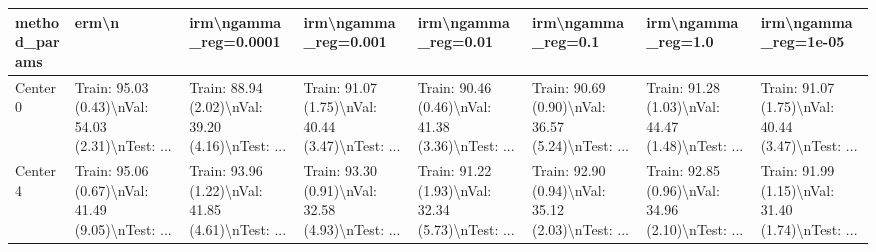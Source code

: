 \begin{tabular}{llllllll}
\toprule
method\_params &                                              erm\textbackslash n &                              irm\textbackslash ngamma\_reg=0.0001 &                               irm\textbackslash ngamma\_reg=0.001 &                                irm\textbackslash ngamma\_reg=0.01 &                                 irm\textbackslash ngamma\_reg=0.1 &                                 irm\textbackslash ngamma\_reg=1.0 &                               irm\textbackslash ngamma\_reg=1e-05 \\
\midrule
Center 0 &  Train: 95.03 (0.43)\textbackslash nVal: 54.03 (2.31)\textbackslash nTest: ... &  Train: 88.94 (2.02)\textbackslash nVal: 39.20 (4.16)\textbackslash nTest: ... &  Train: 91.07 (1.75)\textbackslash nVal: 40.44 (3.47)\textbackslash nTest: ... &  Train: 90.46 (0.46)\textbackslash nVal: 41.38 (3.36)\textbackslash nTest: ... &  Train: 90.69 (0.90)\textbackslash nVal: 36.57 (5.24)\textbackslash nTest: ... &  Train: 91.28 (1.03)\textbackslash nVal: 44.47 (1.48)\textbackslash nTest: ... &  Train: 91.07 (1.75)\textbackslash nVal: 40.44 (3.47)\textbackslash nTest: ... \\
Center 4 &  Train: 95.06 (0.67)\textbackslash nVal: 41.49 (9.05)\textbackslash nTest: ... &  Train: 93.96 (1.22)\textbackslash nVal: 41.85 (4.61)\textbackslash nTest: ... &  Train: 93.30 (0.91)\textbackslash nVal: 32.58 (4.93)\textbackslash nTest: ... &  Train: 91.22 (1.93)\textbackslash nVal: 32.34 (5.73)\textbackslash nTest: ... &  Train: 92.90 (0.94)\textbackslash nVal: 35.12 (2.03)\textbackslash nTest: ... &  Train: 92.85 (0.96)\textbackslash nVal: 34.96 (2.10)\textbackslash nTest: ... &  Train: 91.99 (1.15)\textbackslash nVal: 31.40 (1.74)\textbackslash nTest: ... \\
\bottomrule
\end{tabular}
